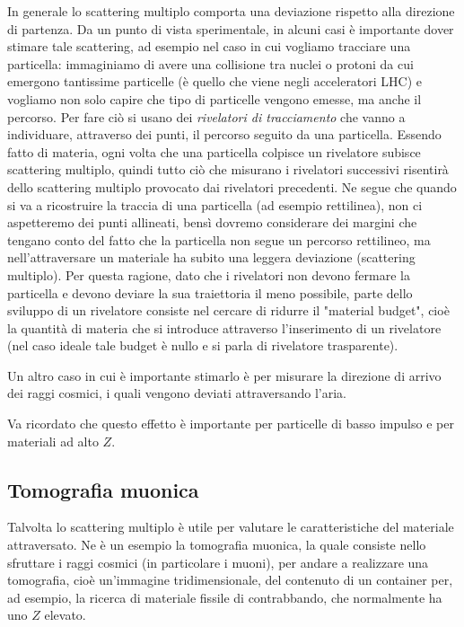 In generale lo scattering multiplo comporta una deviazione rispetto alla direzione di partenza. Da un punto di vista sperimentale, in alcuni casi è importante dover stimare tale scattering, ad esempio nel caso in cui vogliamo tracciare una particella: immaginiamo di avere una collisione tra nuclei o protoni da cui emergono tantissime particelle (è quello che viene negli acceleratori LHC) e vogliamo non solo capire che tipo di particelle vengono emesse, ma anche il percorso. Per fare ciò si usano dei \textit{rivelatori di tracciamento} che vanno a individuare, attraverso dei punti, il percorso seguito da una particella. Essendo fatto di materia, ogni volta che una particella colpisce un rivelatore subisce scattering multiplo, quindi tutto ciò che misurano i rivelatori successivi risentirà dello scattering multiplo provocato dai rivelatori precedenti. Ne segue che quando si va a ricostruire la traccia di una particella (ad esempio rettilinea), non ci aspetteremo dei punti allineati, bensì dovremo considerare dei margini che tengano conto del fatto che la particella non segue un percorso rettilineo, ma nell'attraversare un materiale ha subito una leggera deviazione (scattering multiplo). Per questa ragione, dato che i rivelatori non devono fermare la particella e devono deviare la sua traiettoria il meno possibile, parte dello sviluppo di un rivelatore consiste nel cercare di ridurre il "material budget", cioè la quantità di materia che si introduce attraverso l'inserimento di un rivelatore (nel caso ideale tale budget è nullo e si parla di rivelatore trasparente).

Un altro caso in cui è importante stimarlo è per misurare la direzione di arrivo dei raggi cosmici, i quali vengono deviati attraversando l'aria.

Va ricordato che questo effetto è importante per particelle di basso impulso e per materiali ad alto $Z$.

\subsection{Tomografia muonica}

Talvolta lo scattering multiplo è utile per valutare le caratteristiche del materiale attraversato. Ne è un esempio la tomografia muonica, la quale consiste nello sfruttare i raggi cosmici (in particolare i muoni), per andare a realizzare una tomografia, cioè un'immagine tridimensionale, del contenuto di un container per, ad esempio, la ricerca di materiale fissile di contrabbando, che normalmente ha uno $Z$ elevato.

